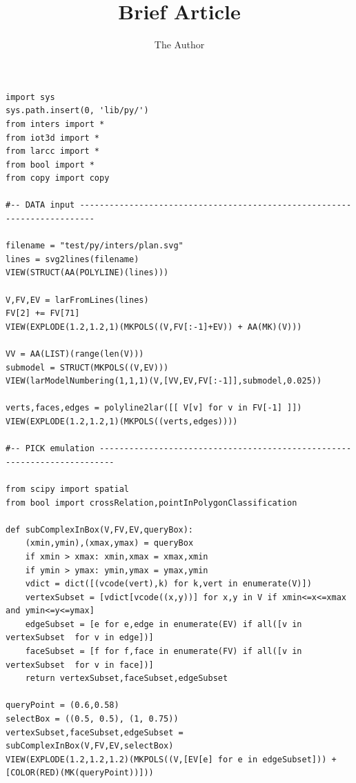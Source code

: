 \documentclass[11pt, oneside]{article}   	%
\title{Brief Article}
\author{The Author}
\begin{document}
\maketitle


\begin{verbatim}
import sys
sys.path.insert(0, 'lib/py/')
from inters import *
from iot3d import *
from larcc import *
from bool import *
from copy import copy

#-- DATA input -------------------------------------------------------------------------

filename = "test/py/inters/plan.svg"
lines = svg2lines(filename)
VIEW(STRUCT(AA(POLYLINE)(lines)))
    
V,FV,EV = larFromLines(lines)
FV[2] += FV[71]
VIEW(EXPLODE(1.2,1.2,1)(MKPOLS((V,FV[:-1]+EV)) + AA(MK)(V)))

VV = AA(LIST)(range(len(V)))
submodel = STRUCT(MKPOLS((V,EV)))
VIEW(larModelNumbering(1,1,1)(V,[VV,EV,FV[:-1]],submodel,0.025))

verts,faces,edges = polyline2lar([[ V[v] for v in FV[-1] ]])
VIEW(EXPLODE(1.2,1.2,1)(MKPOLS((verts,edges))))

#-- PICK emulation -------------------------------------------------------------------------

from scipy import spatial
from bool import crossRelation,pointInPolygonClassification

def subComplexInBox(V,FV,EV,queryBox):
    (xmin,ymin),(xmax,ymax) = queryBox
    if xmin > xmax: xmin,xmax = xmax,xmin
    if ymin > ymax: ymin,ymax = ymax,ymin
    vdict = dict([(vcode(vert),k) for k,vert in enumerate(V)])
    vertexSubset = [vdict[vcode((x,y))] for x,y in V if xmin<=x<=xmax and ymin<=y<=ymax]
    edgeSubset = [e for e,edge in enumerate(EV) if all([v in vertexSubset  for v in edge])]    
    faceSubset = [f for f,face in enumerate(FV) if all([v in vertexSubset  for v in face])]
    return vertexSubset,faceSubset,edgeSubset

queryPoint = (0.6,0.58)
selectBox = ((0.5, 0.5), (1, 0.75))
vertexSubset,faceSubset,edgeSubset = subComplexInBox(V,FV,EV,selectBox)
VIEW(EXPLODE(1.2,1.2,1.2)(MKPOLS((V,[EV[e] for e in edgeSubset])) + [COLOR(RED)(MK(queryPoint))]))


\end{verbatim}
\end{document}
